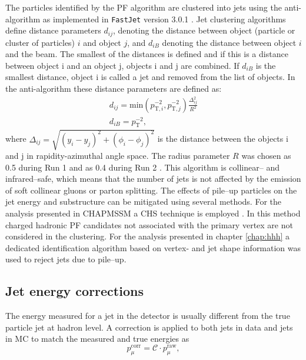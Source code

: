 The particles identified by the \ac{PF} algorithm
are clustered into jets using the anti-\kT algorithm \cite{antiKT} as implemented
in \texttt{FastJet} version 3.0.1 \cite{fastjet}. Jet clustering algorithms 
define distance parameters $d_{ij}$, denoting the distance between object (particle or cluster of 
particles) $i$ and 
object $j$, and $d_{iB}$ denoting the distance between 
object $i$ and the beam. The smallest of the distances
is defined and if this is a distance between object i and an object j, objects
i and j are combined. If $d_{iB}$ is the smallest distance, object i
is called a jet and removed from the list of objects. In the anti-\kT algorithm
these distance parameters are defined as:
\begin{align}\label{eqn:objects_antikt}
d_{ij}=\text{min}(p_{\text{T},i}^{-2},p_{\text{T},j}^{-2})\frac{\Delta_{ij}^2}{R^2}\\
d_{iB} = p_{\text{T}}^{-2},
\end{align}
where $\Delta_{ij} = \sqrt{(y_i-y_j)^2+(\phi_i - \phi_j)^2}$ is the distance
between the objects i and j in rapidity-azimuthal angle space. The radius
parameter $R$ was chosen as 0.5 during Run 1 \cite{cms-jec-2011} and as 0.4 during Run 2 \cite{cms-jets-run2}. 
This algorithm is collinear-- and infrared--safe, which means that the number of jets
is not affected by the emission of soft collinear gluons or parton splitting. 
The effects of pile--up particles on the jet energy and substructure can be
mitigated using several methods. For the analysis presented in CHAPMSSM a
\ac{CHS} technique is employed \cite{cms-jets-run2}.  In this method
charged hadronic \ac{PF} candidates not associated with the primary vertex 
are not considered in the clustering. For the analysis presented in
chapter \ref{chap:hhh} a dedicated identification algorithm \cite{cms-jets-puid} 
based on vertex- and jet shape information was used to reject jets due to pile--up.

\subsection{Jet energy corrections}
\label{sec:objects_jets_jec}
The energy measured for a jet in the detector is usually different from 
the true particle jet at hadron level. A correction is applied to both
jets in data and jets in \ac{MC} to match the measured and true
energies as
\begin{equation}\label{eqn:objects_jec}
p_{\mu}^{\text{corr}} = \mathcal{C}\cdot p_{\mu}^{\text{raw}},
\end{equation}

